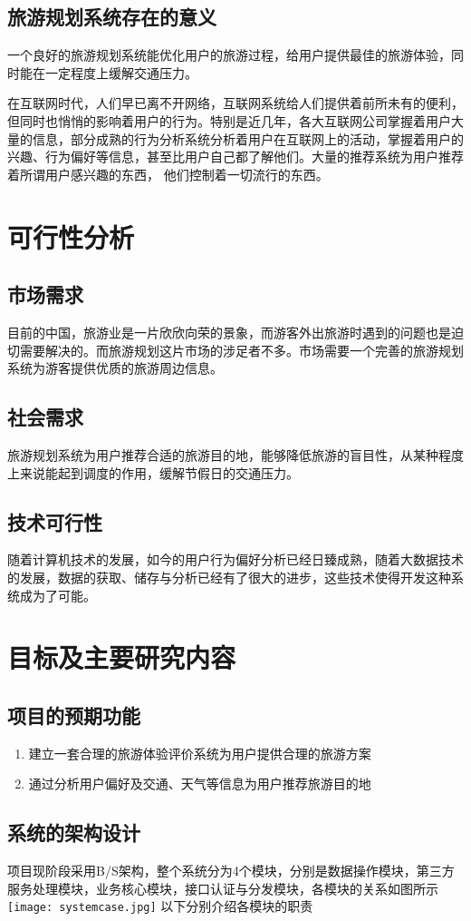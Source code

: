 \documentclass[titlepage]{article}
\begin{document}
\subsection{旅游规划系统存在的意义}
一个良好的旅游规划系统能优化用户的旅游过程，给用户提供最佳的旅游体验，同时能在一定程度上缓解交通压力。

在互联网时代，人们早已离不开网络，互联网系统给人们提供着前所未有的便利，但同时也悄悄的影响着用户的行为。特别是近几年，各大互联网公司掌握着用户大量的信息，部分成熟的行为分析系统分析着用户在互联网上的活动，掌握着用户的兴趣、行为偏好等信息，甚至比用户自己都了解他们。大量的推荐系统为用户推荐着所谓用户感兴趣的东西，
他们控制着一切流行的东西。
\section{可行性分析}
\subsection{市场需求}
目前的中国，旅游业是一片欣欣向荣的景象，而游客外出旅游时遇到的问题也是迫切需要解决的。而旅游规划这片市场的涉足者不多。市场需要一个完善的旅游规划系统为游客提供优质的旅游周边信息。
\subsection{社会需求}
旅游规划系统为用户推荐合适的旅游目的地，能够降低旅游的盲目性，从某种程度上来说能起到调度的作用，缓解节假日的交通压力。
\subsection{技术可行性}
随着计算机技术的发展，如今的用户行为偏好分析已经日臻成熟，随着大数据技术的发展，数据的获取、储存与分析已经有了很大的进步，这些技术使得开发这种系统成为了可能。
\section{目标及主要研究内容}
\subsection{项目的预期功能}
\begin{enumerate}
\item 建立一套合理的旅游体验评价系统为用户提供合理的旅游方案
\item 通过分析用户偏好及交通、天气等信息为用户推荐旅游目的地
\end{enumerate}
\subsection{系统的架构设计}
项目现阶段采用B/S架构，整个系统分为4个模块，分别是数据操作模块，第三方服务处理模块，业务核心模块，接口认证与分发模块，各模块的关系如图所示
\texttt{[image: systemcase.jpg]}
以下分别介绍各模块的职责
\end{document}
